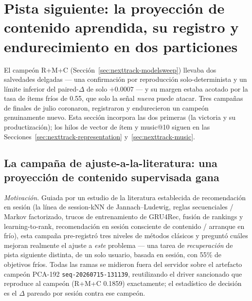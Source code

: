 \documentclass[11pt]{article}
\newcommand{\dsid}[1]{\texttt{\small #1}}
\begin{document}
\section{Pista siguiente: la proyección de contenido aprendida, su registro y endurecimiento en dos particiones}
\label{sec:nexttrack-projection}
El campeón R+M+C (Sección~\ref{sec:nexttrack-modelsweep}) llevaba dos salvedades
delgadas --- una confirmación por reproducción solo-determinista y un límite inferior
del paired-$\Delta$ de solo $+\num{0.0007}$ --- y su margen estaba acotado por la tasa
de ítems fríos de \num{0.55}, que solo la señal \emph{nueva} puede atacar. Tres
campañas de finales de julio coronaron, registraron y endurecieron un campeón
genuinamente nuevo. Esta sección incorpora las dos primeras (la victoria y su
productización); los hilos de vector de ítem y music@10 siguen en las
Secciones~\ref{sec:nexttrack-representation} y~\ref{sec:nexttrack-music}.

\subsection{La campaña de ajuste-a-la-literatura: una proyección de contenido supervisada gana}
\label{sec:nexttrack-projection-win}
\emph{Motivación.} Guiada por un estudio de la literatura establecida de recomendación
en sesión (la línea de session-kNN de Jannach--Ludewig, reglas secuenciales / Markov
factorizado, trucos de entrenamiento de GRU4Rec, fusión de rankings y
learning-to-rank, recomendación en sesión consciente de contenido / arranque en
frío), esta campaña pre-registró tres niveles de métodos clásicos y preguntó cuáles
mejoran realmente el ajuste a \emph{este} problema --- una tarea de
\emph{recuperación} de pista siguiente distinta, de un solo usuario, basada en sesión,
con 55\% de objetivos fríos. Todas las ramas se midieron fuera del servidor sobre el
artefacto campeón PCA-192 \dsid{seq-20260715-131139}, reutilizando el driver
sancionado que reproduce al campeón (R+M+C \num{0.1859}) exactamente; el estadístico
de decisión es el $\Delta$ pareado por sesión contra ese campeón.
\end{document}
